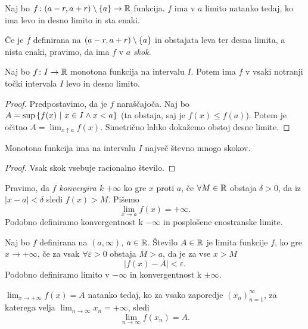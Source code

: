 \documentclass[12pt, a4paper]{article}
\begin{document}
\begin{trditev}
Naj bo $f\colon(a-r,a+r)\setminus\left\{a\right\}\to\mathbb{R}$ funkcija. $f$ ima v $a$ limito natanko tedaj, ko ima levo in desno limito in sta enaki.
\end{trditev}

\obvs

\begin{opomba}
Če je $f$ definirana na $(a-r,a+r)\setminus\left\{a\right\}$ in obstajata leva ter desna limita, a nista enaki, pravimo, da ima $f$ v $a$ \emph{skok}.
\end{opomba}

\begin{izrek}
Naj bo $f\colon I\to\mathbb{R}$ monotona funkcija na intervalu $I$. Potem ima $f$ v vsaki notranji točki intervala $I$ levo in desno limito.
\end{izrek}

\begin{proof}
Predpostavimo, da je $f$ naraščajoča. Naj bo $A=\sup\left\{f(x)~\middle\vert~x\in I\land x<a\right\}$ (ta obstaja, saj je $f(x)\leq f(a)$). Potem je očitno $A=\displaystyle\lim_{x\uparrow a}f(x)$. Simetrično lahko dokažemo obstoj desne limite.
\end{proof}

\begin{posledica}
Monotona funkcija ima na intervalu $I$ največ števno mnogo skokov.
\end{posledica}

\begin{proof}
Vsak skok vsebuje racionalno število.
\end{proof}

\begin{definicija}
Pravimo, da $f$ \emph{konvergira k $+\infty$} ko gre $x$ proti $a$, če $\forall M\in\mathbb{R}$ obstaja $\delta>0$, da iz $|x-a|<\delta$ sledi $f(x)>M$. Pišemo
\[
\lim_{x\to a}f(x)=+\infty.
\]
Podobno definiramo konvergentnost k $-\infty$ in posplošene enostranske limite.
\end{definicija}

\begin{definicija}
Naj bo $f$ definirana na $(a,\infty)$, $a\in\mathbb{R}$. Število $A\in\mathbb{R}$ je limita funkcije $f$, ko gre $x\to+\infty$, če za vsak $\forall\varepsilon>0$ obstaja $M>a$, da je za vse $x>M$
\[
|f(x)-A|<\varepsilon.
\]
Podobno definiramo limito v $-\infty$ in konvergentnost k $\pm\infty$.
\end{definicija}

\begin{opomba}
$\displaystyle\lim_{x\to+\infty}f(x)=A$ natanko tedaj, ko za vsako zaporedje $(x_n)_{n=1}^\infty$, za katerega velja $\displaystyle\lim_{n\to\infty}x_n=+\infty$, sledi
\[
\lim_{n\to\infty}f(x_n)=A.
\]
\end{opomba}
\end{document}

